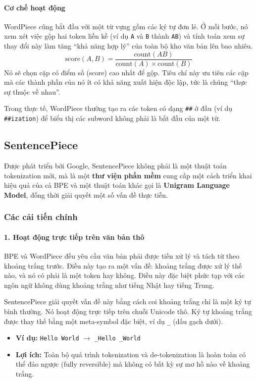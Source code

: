 \paragraph{Cơ chế hoạt động}
WordPiece cũng bắt đầu với một từ vựng gồm các ký tự đơn lẻ. Ở mỗi bước, nó xem xét việc gộp hai token liền kề (ví dụ \texttt{A} và \texttt{B} thành \texttt{AB}) và tính toán xem sự thay đổi này làm tăng “khả năng hợp lý” của toàn bộ kho văn bản lên bao nhiêu.
$$ \text{score}(A, B) = \frac{\text{count}(AB)}{\text{count}(A) \times \text{count}(B)} $$
Nó sẽ chọn cặp có điểm số (score) cao nhất để gộp. Tiêu chí này ưu tiên các cặp mà các thành phần của nó ít có khả năng xuất hiện độc lập, tức là chúng “thực sự thuộc về nhau”.

Trong thực tế, WordPiece thường tạo ra các token có dạng \texttt{\#\#} ở đầu (ví dụ \texttt{\#\#ization}) để biểu thị các subword không phải là bắt đầu của một từ.

\subsection{SentencePiece}
\label{ssec:sentencepiece}

Được phát triển bởi Google, SentencePiece \cite{kudo2018sentencepiece} không phải là một thuật toán tokenization mới, mà là một \textbf{thư viện phần mềm} cung cấp một cách triển khai hiệu quả của cả BPE và một thuật toán khác gọi là \textbf{Unigram Language Model}, đồng thời giải quyết một số vấn đề thực tiễn.

\subsubsection{Các cải tiến chính}
\paragraph{1. Hoạt động trực tiếp trên văn bản thô}
BPE và WordPiece đều yêu cầu văn bản phải được tiền xử lý và tách từ theo khoảng trắng trước. Điều này tạo ra một vấn đề: khoảng trắng được xử lý thế nào, và nó có phải là một token hay không. Điều này đặc biệt phức tạp với các ngôn ngữ không dùng khoảng trắng như tiếng Nhật hay tiếng Trung.

SentencePiece giải quyết vấn đề này bằng cách coi khoảng trắng chỉ là một ký tự bình thường. Nó hoạt động trực tiếp trên chuỗi Unicode thô. Ký tự khoảng trắng được thay thế bằng một meta-symbol đặc biệt, ví dụ \texttt{\_} (dấu gạch dưới).
\begin{itemize}
    \item \textbf{Ví dụ:} \texttt{Hello World} $\rightarrow$ \texttt{\_Hello \_World}
    \item \textbf{Lợi ích:} Toàn bộ quá trình tokenization và de-tokenization là hoàn toàn có thể đảo ngược (fully reversible) mà không có bất kỳ sự mơ hồ nào về khoảng trắng.
\end{itemize}

